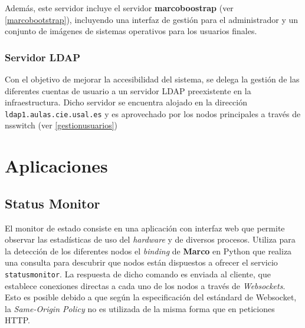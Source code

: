 Además, este servidor incluye el servidor \textbf{marcoboostrap} (ver \ref{marcobootstrap}), incluyendo una interfaz de gestión para el administrador y un conjunto de imágenes de sistemas operativos para los usuarios finales.

\subsubsection{Servidor LDAP}

Con el objetivo de mejorar la accesibilidad del sistema, se delega la gestión de las diferentes cuentas de usuario a un servidor LDAP preexistente en la infraestructura. Dicho servidor se encuentra alojado en la dirección \texttt{ldap1.aulas.cie.usal.es} y es aprovechado por los nodos principales a través de nsswitch (ver \ref{gestionusuarios}) 


\section{Aplicaciones}


\subsection{Status Monitor}

El monitor de estado consiste en una aplicación con interfaz web que permite observar las estadísticas de uso del \textit{hardware} y de diversos procesos. Utiliza para la detección de los diferentes nodos el \textit{binding} de \textbf{Marco} en Python que realiza una consulta para descubrir que nodos están dispuestos a ofrecer el servicio \texttt{statusmonitor}. La respuesta de dicho comando es enviada al cliente, que establece conexiones directas a cada uno de los nodos a través de \textit{Websockets}\cite{rfc6455}. Esto es posible debido a que según la especificación del estándard de Websocket, la \textit{Same-Origin Policy} no es utilizada de la misma forma que en peticiones HTTP\cite{rfc6454}.

